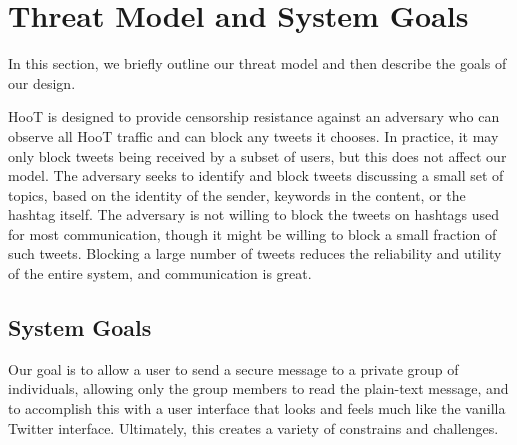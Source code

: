 \section{Threat Model and System Goals}

In this section, we briefly outline our threat model and then describe
the goals of our design.

HooT is designed to provide censorship resistance against an adversary
who can observe all HooT traffic and can block any tweets it chooses. In
practice, it may only block tweets being received by a subset of users,
but this does not affect our model. The adversary seeks to identify and
block tweets discussing a small set of topics, based on the identity of
the sender, keywords in the content, or the hashtag itself. The
adversary is not willing to block the tweets on hashtags used for most
communication, though it might be willing to block a small fraction of
such tweets. Blocking a large number of tweets reduces the reliability
and utility of the entire system, and communication is great.


\subsection{System Goals}
Our goal is to allow a user to send a secure message to a private group
of individuals, allowing only the group members to read the plain-text
message, and to accomplish this with a user interface that looks and
feels much like the vanilla Twitter interface. Ultimately, this creates
a variety of constrains and challenges.

